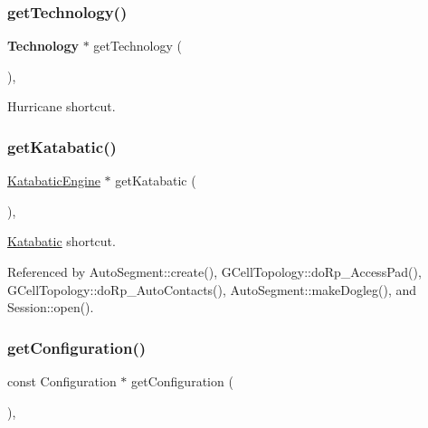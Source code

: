 \subsubsection{\texorpdfstring{get\+Technology()}{getTechnology()}}
{\footnotesize\ttfamily \textbf{ Technology} $\ast$ get\+Technology (\begin{DoxyParamCaption}{ }\end{DoxyParamCaption})\hspace{0.3cm}{\ttfamily [inline]}, {\ttfamily [static]}}

Hurricane shortcut. \mbox{\label{classKatabatic_1_1Session_a1ec4ff2ad2a5b964c0ff98170a366197}} 
\subsubsection{\texorpdfstring{get\+Katabatic()}{getKatabatic()}}
{\footnotesize\ttfamily \mbox{\hyperlink{classKatabatic_1_1KatabaticEngine}{Katabatic\+Engine}} $\ast$ get\+Katabatic (\begin{DoxyParamCaption}{ }\end{DoxyParamCaption})\hspace{0.3cm}{\ttfamily [inline]}, {\ttfamily [static]}}

\mbox{\hyperlink{namespaceKatabatic}{Katabatic}} shortcut. 

Referenced by Auto\+Segment\+::create(), G\+Cell\+Topology\+::do\+Rp\+\_\+\+Access\+Pad(), G\+Cell\+Topology\+::do\+Rp\+\_\+\+Auto\+Contacts(), Auto\+Segment\+::make\+Dogleg(), and Session\+::open().

\mbox{\label{classKatabatic_1_1Session_a4d9fd503149d2fff66eb8ba3955b7a13}} 
\subsubsection{\texorpdfstring{get\+Configuration()}{getConfiguration()}}
{\footnotesize\ttfamily const Configuration $\ast$ get\+Configuration (\begin{DoxyParamCaption}{ }\end{DoxyParamCaption})\hspace{0.3cm}{\ttfamily [inline]}, {\ttfamily [static]}}

